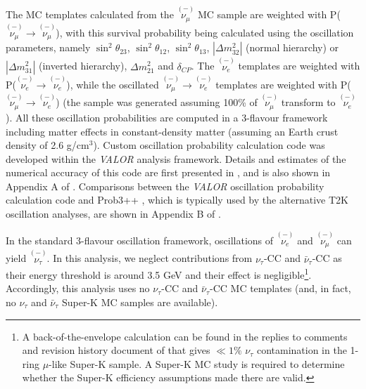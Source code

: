 The MC templates calculated from the $\overset{\scriptscriptstyle{(-)}}{\nu_\mu}$ MC sample are weighted 
with P($\overset{\scriptscriptstyle{(-)}}{\nu_\mu} \rightarrow \overset{\scriptscriptstyle{(-)}}{\nu_\mu}$), with this survival probability being calculated using the 
oscillation parameters, namely $\sin^{2} \theta_{23}$, $\sin^{2} \theta_{12}$, $\sin^{2} \theta_{13}$, 
$|\Delta m^{2}_{32}|$ (normal hierarchy) or $|\Delta m^{2}_{31}|$ (inverted hierarchy), 
$\Delta m^{2}_{21}$ and $\delta_{CP}$. The $\overset{\scriptscriptstyle{(-)}}{\nu_e}$ templates are weighted with P($\overset{\scriptscriptstyle{(-)}}{\nu_e} \rightarrow \overset{\scriptscriptstyle{(-)}}{\nu_e}$), 
while the oscillated $\overset{\scriptscriptstyle{(-)}}{\nu_\mu} \rightarrow \overset{\scriptscriptstyle{(-)}}{\nu_e}$ templates are weighted with P($\overset{\scriptscriptstyle{(-)}}{\nu_\mu} \rightarrow \overset{\scriptscriptstyle{(-)}}{\nu_e}$) 
(the sample was generated assuming 100\% of $\overset{\scriptscriptstyle{(-)}}{\nu_\mu}$ transform to $\overset{\scriptscriptstyle{(-)}}{\nu_e}$). 
All these oscillation probabilities are computed in a 3-flavour framework including matter effects in constant-density matter
(assuming an Earth crust density of 2.6 g/cm$^{3}$).
Custom oscillation probability calculation code was developed within the {\em VALOR} analysis framework.
Details and estimates of the numerical accuracy of this code are first presented in \cite{OurRun12DisappAnalysis3Flavour},
and is also shown in Appendix A of \cite{OurRun123DisappAnalysis3Flavour}.
Comparisons between the {\em VALOR} oscillation probability calculation code and Prob3++ \cite{Prob3}, 
which is typically used by the alternative T2K oscillation analyses, are shown in Appendix B of \cite{OurRun123DisappAnalysis3Flavour}.

In the standard 3-flavour oscillation framework,
oscillations of $\overset{\scriptscriptstyle{(-)}}{\nu_e}$ and $\overset{\scriptscriptstyle{(-)}}{\nu_\mu}$ can yield $\overset{\scriptscriptstyle{(-)}}{\nu_\tau}$.
In this analysis, we neglect contributions from $\nu_{\tau}$-CC and $\bar{\nu}_{\tau}$-CC as their
energy threshold is around 3.5 GeV and their effect is negligible\footnote{
A back-of-the-envelope calculation can be found in the replies to
comments and revision history document of
\cite{OurRun123DisappAnalysis3Flavour} that gives $\ll 1\%$ $\nu_\tau$
contamination in the 1-ring $\mu$-like Super-K sample. A Super-K MC study is required
to determine whether the Super-K efficiency assumptions made there are valid.
  }.
Accordingly, this analysis uses no $\nu_{\tau}$-CC and $\bar{\nu}_{\tau}$-CC MC templates
(and, in fact, no $\nu_{\tau}$ and $\bar{\nu}_{\tau}$ Super-K MC samples are available).

